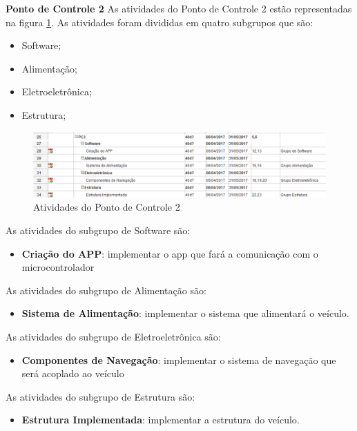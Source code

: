 		\textbf{Ponto de Controle 2}
		As atividades do Ponto de Controle 2 estão representadas na figura \ref{img:PC2}. As atividades foram divididas em quatro subgrupos que são:
		
		\begin{itemize}
			\item Software;
			\item Alimentação;
			\item Eletroeletrônica;
			\item Estrutura;
		\end{itemize}	
		
		\graphicspath{{figuras/}}
		\begin{figure}[h!]
			\centering
			\includegraphics[width=\textwidth]{PC2}
			\caption{Atividades do Ponto de Controle 2}
			\label{img:PC2}
		\end{figure}	
		
		As atividades do subgrupo de Software são:
		
		\begin{itemize}
			\item \textbf{Criação do APP}: implementar o app que fará a comunicação com o microcontrolador
		\end{itemize}
		
		As atividades do subgrupo de Alimentação são:
		\begin{itemize}
			\item \textbf{Sistema de Alimentação}: implementar o sistema que alimentará o veículo.
		\end{itemize}
		
		As atividades do subgrupo de Eletroeletrônica são:
		\begin{itemize}
			\item \textbf{Componentes de Navegação}: implementar o sistema de navegação que será acoplado ao veículo
		\end{itemize}
		
		As atividades do subgrupo de Estrutura são:
		\begin{itemize}
			\item \textbf{Estrutura Implementada}: implementar a estrutura do veículo.
		\end{itemize}
		
